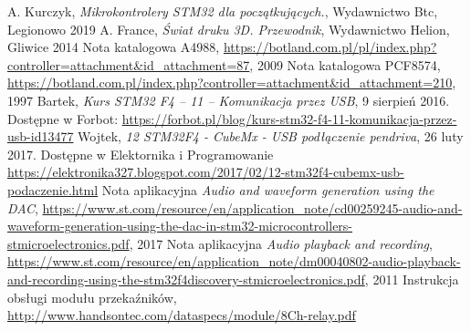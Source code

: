 \documentclass[10pt, a4paper]{article}
\begin{document}
\newpage
%
%
\begin{thebibliography}{9}

    A. Kurczyk, \emph{Mikrokontrolery STM32 dla początkujących.}, Wydawnictwo Btc, Legionowo 2019
    A. France, \emph{Świat druku 3D. Przewodnik}, Wydawnictwo Helion, Gliwice 2014
    Nota katalogowa A4988, \url{https://botland.com.pl/pl/index.php?controller=attachment&id_attachment=87}, 2009
    Nota katalogowa PCF8574, \url{https://botland.com.pl/index.php?controller=attachment&id_attachment=210}, 1997
    Bartek, \emph{Kurs STM32 F4 – 11 – Komunikacja przez USB}, 9 sierpień 2016. Dostępne w Forbot: \url{https://forbot.pl/blog/kurs-stm32-f4-11-komunikacja-przez-usb-id13477}
    Wojtek, \emph{12 STM32F4 - CubeMx - USB podłączenie pendriva}, 26 luty 2017. Dostępne w Elektornika i Programowanie \url{https://elektronika327.blogspot.com/2017/02/12-stm32f4-cubemx-usb-podaczenie.html}
    Nota aplikacyjna \emph{Audio and waveform generation using the DAC}, \url{https://www.st.com/resource/en/application_note/cd00259245-audio-and-waveform-generation-using-the-dac-in-stm32-microcontrollers-stmicroelectronics.pdf}, 2017
    Nota aplikacyjna \emph{Audio playback and recording},
    \url{https://www.st.com/resource/en/application_note/dm00040802-audio-playback-and-recording-using-the-stm32f4discovery-stmicroelectronics.pdf}, 2011
    Instrukcja obsługi modułu przekaźników, \url{http://www.handsontec.com/dataspecs/module/8Ch-relay.pdf}
\end{thebibliography}
\end{document}
